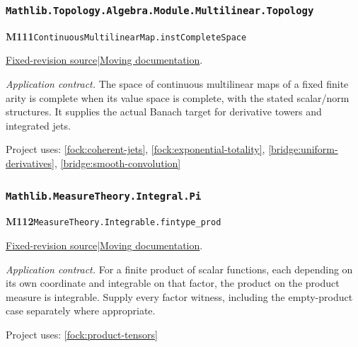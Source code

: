 \documentclass[11pt,a4paper]{article}
\theoremstyle{definition}
\theoremstyle{remark}
\begin{document}
\subsubsection*{\nolinkurl{Mathlib.Topology.Algebra.Module.Multilinear.Topology}}
\noindent\textbf{M111}\label{base:M111}\quad\nolinkurl{ContinuousMultilinearMap.instCompleteSpace}

\href{https://github.com/leanprover-community/mathlib4/blob/9bac2d0692944a775113f7c130fd5e5b4608a854/Mathlib/Topology/Algebra/Module/Multilinear/Topology.lean}{Fixed-revision source}\quad|\quad\href{https://leanprover-community.github.io/mathlib4_docs/Mathlib/Topology/Algebra/Module/Multilinear/Topology.html#ContinuousMultilinearMap.instCompleteSpace}{Moving documentation}.\par
\noindent\textit{Application contract.} The space of continuous multilinear maps of a fixed finite arity is complete when its value space is complete, with the stated scalar/norm structures. It supplies the actual Banach target for derivative towers and integrated jets.\par
{\small Project uses: \ref{fock:coherent-jets}, \ref{fock:exponential-totality}, \ref{bridge:uniform-derivatives}, \ref{bridge:smooth-convolution}}\par\medskip

\subsubsection*{\nolinkurl{Mathlib.MeasureTheory.Integral.Pi}}
\noindent\textbf{M112}\label{base:M112}\quad\nolinkurl{MeasureTheory.Integrable.fintype_prod}

\href{https://github.com/leanprover-community/mathlib4/blob/9bac2d0692944a775113f7c130fd5e5b4608a854/Mathlib/MeasureTheory/Integral/Pi.lean}{Fixed-revision source}\quad|\quad\href{https://leanprover-community.github.io/mathlib4_docs/Mathlib/MeasureTheory/Integral/Pi.html#MeasureTheory.Integrable.fintype_prod}{Moving documentation}.\par
\noindent\textit{Application contract.} For a finite product of scalar functions, each depending on its own coordinate and integrable on that factor, the product on the product measure is integrable. Supply every factor witness, including the empty-product case separately where appropriate.\par
{\small Project uses: \ref{fock:product-tensors}}\par\medskip
\end{document}
